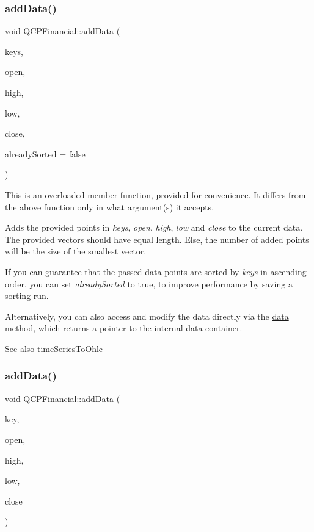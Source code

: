 \subsubsection{\texorpdfstring{add\+Data()}{addData()}\hspace{0.1cm}{\footnotesize\ttfamily [1/2]}}
{\footnotesize\ttfamily void Q\+C\+P\+Financial\+::add\+Data (\begin{DoxyParamCaption}\item[{const Q\+Vector$<$ double $>$ \&}]{keys,  }\item[{const Q\+Vector$<$ double $>$ \&}]{open,  }\item[{const Q\+Vector$<$ double $>$ \&}]{high,  }\item[{const Q\+Vector$<$ double $>$ \&}]{low,  }\item[{const Q\+Vector$<$ double $>$ \&}]{close,  }\item[{bool}]{already\+Sorted = {\ttfamily false} }\end{DoxyParamCaption})}

This is an overloaded member function, provided for convenience. It differs from the above function only in what argument(s) it accepts.

Adds the provided points in {\itshape keys}, {\itshape open}, {\itshape high}, {\itshape low} and {\itshape close} to the current data. The provided vectors should have equal length. Else, the number of added points will be the size of the smallest vector.

If you can guarantee that the passed data points are sorted by {\itshape keys} in ascending order, you can set {\itshape already\+Sorted} to true, to improve performance by saving a sorting run.

Alternatively, you can also access and modify the data directly via the \hyperlink{class_q_c_p_financial_aec3f666271cf48bd7b87d84fe3f8c074}{data} method, which returns a pointer to the internal data container.

\begin{DoxySeeAlso}{See also}
\hyperlink{class_q_c_p_financial_a9a058c035040d3939b8884f4aaccb1a7}{time\+Series\+To\+Ohlc} 
\end{DoxySeeAlso}
\mbox{\label{class_q_c_p_financial_a688bbd052e00a02954ddb0068b378170}} 
\subsubsection{\texorpdfstring{add\+Data()}{addData()}\hspace{0.1cm}{\footnotesize\ttfamily [2/2]}}
{\footnotesize\ttfamily void Q\+C\+P\+Financial\+::add\+Data (\begin{DoxyParamCaption}\item[{double}]{key,  }\item[{double}]{open,  }\item[{double}]{high,  }\item[{double}]{low,  }\item[{double}]{close }\end{DoxyParamCaption})}

